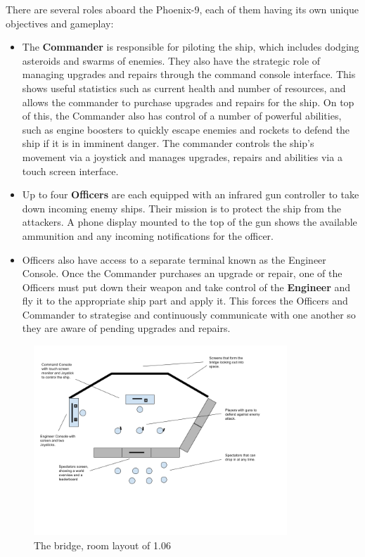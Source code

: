 \documentclass[a4paper,11pt]{article}
\begin{document}
There are several roles aboard the Phoenix-9, each of them having its own unique objectives and gameplay:

\begin{itemize}[noitemsep,topsep=.5ex]
  \item The \textbf{Commander} is responsible for piloting the ship, which includes dodging asteroids and swarms of enemies. They also have the strategic role of managing upgrades and repairs through the command console interface. This shows useful statistics such as current health and number of resources, and allows the commander to purchase upgrades and repairs for the ship. On top of this, the Commander also has control of a number of powerful abilities, such as engine boosters to quickly escape enemies and rockets to defend the ship if it is in imminent danger. 
  The commander controls the ship's movement via a joystick and manages upgrades, repairs and abilities via a touch screen interface. 

  \item Up to four \textbf{Officers} are each equipped with an infrared gun controller to take down incoming enemy ships. Their mission is to protect the ship from the attackers. A phone display mounted to the top of the gun shows the available ammunition and any incoming notifications for the officer.

  \item Officers also have access to a separate terminal known as the Engineer Console. Once the Commander purchases an upgrade or repair, one of the Officers must put down their weapon and take control of the \textbf{Engineer} and fly it to the appropriate ship part and apply it. This forces the Officers and Commander to strategise and continuously communicate with one another so they are aware of pending upgrades and repairs.
\end{itemize}

\begin{figure}[h!]
	\centering
    \includegraphics[width=0.85\textwidth]{images/Room}
    \caption{The bridge, room layout of 1.06}
    \label{fig:room_layout}
\end{figure}
\end{document}
